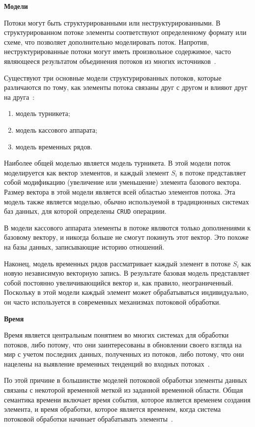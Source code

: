 \textbf{Модели}

Потоки могут быть структурированными или неструктурированными. 
В структурированном потоке элементы соответствуют определенному формату или схеме, что позволяет дополнительно моделировать поток. 
Напротив, неструктурированные потоки могут иметь произвольное содержимое, часто являющееся результатом объединения потоков из многих источников~\cite{10.1007/978-3-642-53974-9_6}.

Существуют три основные модели структурированных потоков, которые различаются по тому, как элементы потока связаны друг с другом и влияют друг на друга~\cite{stream-def}: 
\begin{enumerate}
  \item модель турникета;
  \item модель кассового аппарата; 
  \item модель временных рядов. 
\end{enumerate}

Наиболее общей моделью является модель турникета. 
В этой модели поток моделируется как вектор элементов, и каждый элемент $S_{i}$ в потоке представляет собой модификацию (увеличение или уменьшение) элемента базового вектора. 
Размер вектора в этой модели является всей областью элементов потока. 
Эта модель также является моделью, обычно используемой в традиционных системах баз данных, для которой определены \texttt{CRUD} операциии. 

В модели кассового аппарата элементы в потоке являются только дополнениями к базовому вектору, и никогда больше не смогут покинуть этот вектор. 
Это похоже на базы данных, записывающие историю отношений. 

Наконец, модель временных рядов рассматривает каждый элемент в потоке $S_{i}$ как новую независимую векторную запись. 
В результате базовая модель представляет собой постоянно увеличивающийся вектор и, как правило, неограниченный. 
Поскольку в этой модели каждый элемент может обрабатываться индивидуально, он часто используется в современных механизмах потоковой обработки.

\textbf{Время}

Время является центральным понятием во многих системах для обработки потоков, либо потому, что они заинтересованы в обновлении своего взгляда на мир с учетом последних данных, полученных из потоков, либо потому, что они нацелены на выявление временных тенденций во входных потоках~\cite{stream-def}. 

По этой причине в большинстве моделей потоковой обработки элементы данных связаны с некоторой временной меткой из заданной временной области. 
Общая семантика времени включает время события, которое является временем создания элемента, и время обработки, которое является временем, когда система потоковой обработки начинает обрабатывать элементы~\cite{10.14778/2824032.2824076}.

